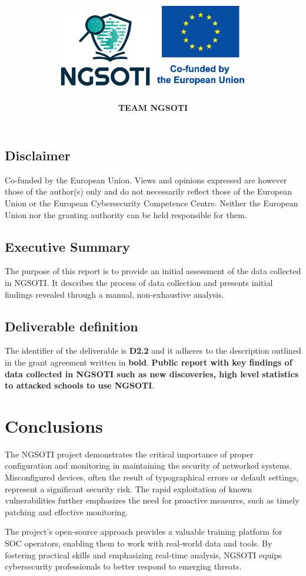 \documentclass[10pt,a4paper]{report}
\title{
    \Huge \textbf{\delivtitle} \\[0.5cm]
    \includegraphics[width=0.3\textwidth]{img/ngsoti.eps}
    \hspace{1cm}
    \includegraphics[width=0.3\textwidth]{img/eu_funded_en.eps}
}
\author{\textbf{TEAM NGSOTI}}
\date{\delivdate}
\begin{document}
\maketitle
\thispagestyle{empty} %

\newpage
\tableofcontents
\newpage
\section*{Disclaimer}
Co-funded by the European Union. Views and opinions expressed are however those of the author(s) only
and do not necessarily reflect those of the European Union or the European Cybersecurity Competence Centre. Neither
the European Union nor the granting authority can be held responsible for them.
\section*{Executive Summary}
The purpose of this report is to provide an initial assessment of the data
collected in NGSOTI. It describes the process of data collection and presents
initial findings revealed through a manual, non-exhaustive analysis.

\section*{Deliverable definition}
The identifier of the deliverable is \textbf{D2.2} and it adheres to the description outlined in the grant agreement written in \textbf{bold}. \textbf{Public report with key findings of data collected in NGSOTI such as new discoveries, high level statistics to attacked schools to use NGSOTI}.






\chapter{Conclusions}
The NGSOTI project demonstrates the critical importance of proper configuration and monitoring in maintaining the security of networked systems. Misconfigured devices, often the result of typographical errors or default settings, represent a significant security risk. The rapid exploitation of known vulnerabilities further emphasizes the need for proactive measures, such as timely patching and effective monitoring.

The project's open-source approach provides a valuable training platform for SOC operators, enabling them to work with real-world data and tools. By fostering practical skills and emphasizing real-time analysis, NGSOTI equips cybersecurity professionals to better respond to emerging threats.


\end{document}
